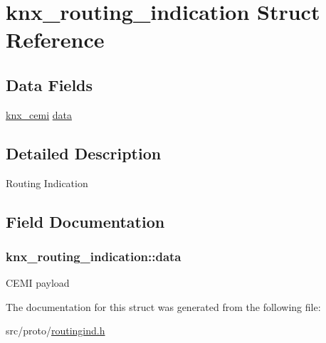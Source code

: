 \hypertarget{structknx__routing__indication}{}\section{knx\+\_\+routing\+\_\+indication Struct Reference}
\label{structknx__routing__indication}
\subsection*{Data Fields}
\begin{DoxyCompactItemize}
\item 
\hyperlink{structknx__cemi}{knx\+\_\+cemi} \hyperlink{structknx__routing__indication_a68caf12d69d7b9cc3668367e4d02cd26}{data}
\end{DoxyCompactItemize}


\subsection{Detailed Description}
Routing Indication 

\subsection{Field Documentation}
\subsubsection[{\texorpdfstring{data}{data}}]{ knx\+\_\+routing\+\_\+indication\+::data}\hypertarget{structknx__routing__indication_a68caf12d69d7b9cc3668367e4d02cd26}{}\label{structknx__routing__indication_a68caf12d69d7b9cc3668367e4d02cd26}
C\+E\+MI payload 

The documentation for this struct was generated from the following file\+:\begin{DoxyCompactItemize}
\item 
src/proto/\hyperlink{routingind_8h}{routingind.\+h}\end{DoxyCompactItemize}
